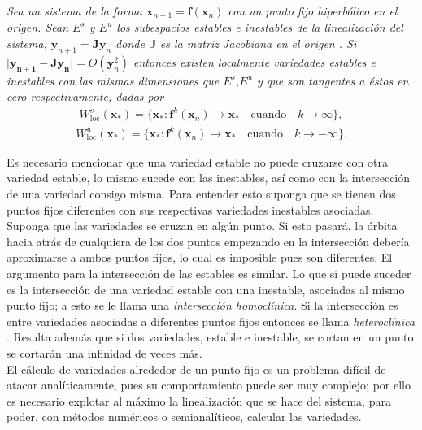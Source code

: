 \begin{thm}
\textit{Sea un sistema de la forma $\mathbf{x}_{n+1}=\mathbf{f}(\mathbf{x}_{n})$ con un punto fijo hiperbólico en el origen. Sean $E^{s}$ y $E^{u}$ los subespacios estables e inestables de la linealización del sistema,
 $\mathbf{y}_{n+1}=\mathbf{J}\mathbf{y}_{n}$ donde $\mathbb{J}$ es la matriz Jacobiana en el origen . Si 
 $\mid \mathbf{y_{n+1}}-\mathbf{J}\mathbf{y_{n}}\mid = O(\mathbf{y}_{n}^{2})$
 entonces existen localmente variedades estables e inestables con las mismas dimensiones que $E^{s}$,$E^{u}$ y que son tangentes a éstos en cero respectivamente, dadas por}
\begin{eqnarray*}
W^{s}_{\mathrm{loc}}(\mathbf{x}_{*})= \lbrace \mathbf{x}_{*} : \mathbf{f}^{k}(\mathbf{x}_{n})\rightarrow \mathbf{x}_{*} \quad\mathrm{cuando}\quad k \rightarrow \infty \rbrace,
\end{eqnarray*}
\begin{eqnarray*}
W^{u}_{\mathrm{loc}}(\mathbf{x}_{*}) = \lbrace \mathbf{x}_{*} : \mathbf{f}^{k}(\mathbf{x}_{n})\rightarrow \mathbf{x}_{*} \quad\mathrm{cuando}\quad k \rightarrow -\infty \rbrace.
\end{eqnarray*}
\end{thm}

Es necesario mencionar que una variedad estable no puede cruzarse con otra variedad estable, lo mismo sucede con las inestables, así como con la intersección de una variedad consigo misma. Para entender esto suponga que se tienen dos puntos fijos diferentes con sus respectivas variedades inestables asociadas. Suponga que las variedades se cruzan en algún punto. Si esto pasará, la órbita hacia atrás de cualquiera de los dos puntos empezando en la intersección debería aproximarse a ambos puntos fijos, lo cual es imposible pues son diferentes. El argumento para la intersección de las estables es similar. Lo que sí puede suceder es la intersección de una variedad estable con una inestable, asociadas al mismo punto fijo; a esto se le llama una \textit{intersección homoclínica}. Si la intersección es entre variedades asociadas a diferentes puntos fijos entonces se llama \textit{heteroclínica} \cite{Ott}. Resulta además que si dos variedades, estable e inestable, se cortan en un punto se cortarán una infinidad de veces más. \\


El cálculo de variedades alrededor de un punto fijo es un problema difícil de atacar analíticamente, pues su comportamiento puede ser muy complejo; por ello es necesario explotar al máximo la linealización que se hace del sistema, para poder, con métodos numéricos o semianalíticos, calcular las variedades. 




